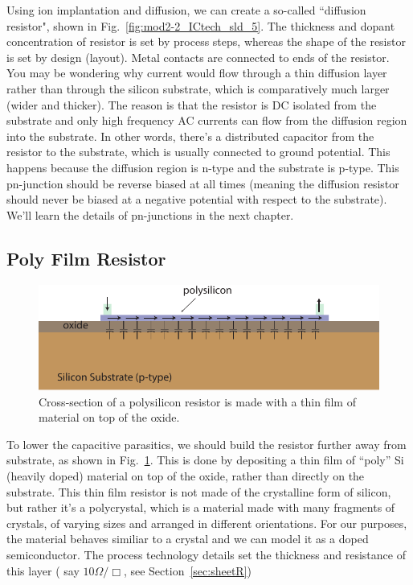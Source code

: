 Using ion implantation and diffusion, we can create a so-called ``diffusion resistor", shown in Fig.~\ref{fig:mod2-2_ICtech_sld_5}.  The thickness and dopant concentration of resistor is set by process steps, whereas the shape of the resistor is set by design (layout).   Metal contacts are connected to ends of the resistor.  You may be wondering why current would flow through a thin diffusion layer rather than through the silicon substrate, which is comparatively much larger (wider and thicker).  The reason is that the resistor is DC isolated from the substrate and only high frequency AC currents can flow from the diffusion region into the substrate.  In other words, there's a distributed capacitor from the resistor to the substrate, which is usually connected to ground potential.  This happens because the diffusion region is n-type and the substrate is p-type.  This pn-junction should be reverse biased at all times (meaning the diffusion resistor should never be biased at a negative potential with respect to the substrate).  We'll learn the details of pn-junctions in the next chapter.

 


\subsection{Poly Film Resistor}

\begin{figure}[tb]
\begin{center}
\includegraphics[width=.7\columnwidth]{poly_resistor}
\end{center}
\caption{Cross-section of a polysilicon resistor is made with a thin film of material on top of the oxide.} \label{fig:mod2-2_ICtech_sld_6}
\end{figure}

To lower the capacitive parasitics, we should build the resistor further away from substrate, as shown in Fig.~\ref{fig:mod2-2_ICtech_sld_6}. This is done by depositing a thin film of “poly” Si (heavily doped) material on top of the oxide, rather than directly on the substrate.  This thin film resistor is not made of the crystalline form of silicon, but rather it's a polycrystal, which is a material made with many fragments of crystals, of varying sizes and arranged in different orientations.   For our purposes, the material behaves similiar to a crystal and we can model it as a doped semiconductor.  The process technology details set the thickness and resistance of this layer ( say $10\Omega/\Box$, see Section~\ref{sec:sheetR}) 

